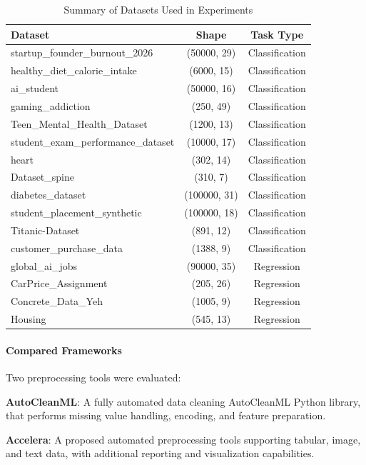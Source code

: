 \begin{table}[H]
\centering
\caption{Summary of Datasets Used in Experiments}
\begin{tabular}{|l|c|c|}
\hline
\textbf{Dataset} & \textbf{Shape} & \textbf{Task Type} \\
\hline
startup\_founder\_burnout\_2026 & (50000, 29) & Classification \\
healthy\_diet\_calorie\_intake & (6000, 15) & Classification \\
ai\_student & (50000, 16) & Classification \\
gaming\_addiction & (250, 49) & Classification \\
Teen\_Mental\_Health\_Dataset & (1200, 13) & Classification \\
student\_exam\_performance\_dataset & (10000, 17) & Classification \\
heart & (302, 14) & Classification \\
Dataset\_spine & (310, 7) & Classification \\
diabetes\_dataset & (100000, 31) & Classification \\
student\_placement\_synthetic & (100000, 18) & Classification \\
Titanic-Dataset & (891, 12) & Classification \\
customer\_purchase\_data & (1388, 9) & Classification \\
global\_ai\_jobs & (90000, 35) & Regression \\
CarPrice\_Assignment & (205, 26) & Regression \\
Concrete\_Data\_Yeh & (1005, 9) & Regression \\
Housing & (545, 13) & Regression \\
\hline
\end{tabular}
\end{table}

\paragraph{Compared Frameworks}\par

Two preprocessing tools were evaluated:

\textbf{AutoCleanML}: A fully automated data cleaning AutoCleanML Python library, that performs missing value handling, encoding, and feature preparation.

\textbf{Accelera}: A proposed automated preprocessing tools supporting tabular, image, and text data, with additional reporting and visualization capabilities.

